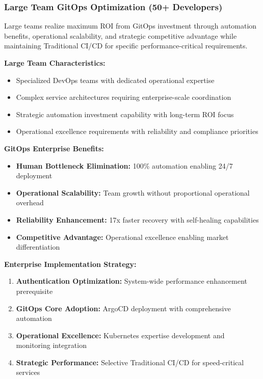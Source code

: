 \subsubsection{Large Team GitOps Optimization (50+ Developers)}

Large teams realize maximum ROI from GitOps investment through automation benefits, operational scalability, and strategic competitive advantage while maintaining Traditional CI/CD for specific performance-critical requirements.

\textbf{Large Team Characteristics:}
\begin{itemize}
\item Specialized DevOps teams with dedicated operational expertise
\item Complex service architectures requiring enterprise-scale coordination
\item Strategic automation investment capability with long-term ROI focus
\item Operational excellence requirements with reliability and compliance priorities
\end{itemize}

\textbf{GitOps Enterprise Benefits:}
\begin{itemize}
\item \textbf{Human Bottleneck Elimination:} 100\% automation enabling 24/7 deployment
\item \textbf{Operational Scalability:} Team growth without proportional operational overhead
\item \textbf{Reliability Enhancement:} 17x faster recovery with self-healing capabilities
\item \textbf{Competitive Advantage:} Operational excellence enabling market differentiation
\end{itemize}

\textbf{Enterprise Implementation Strategy:}
\begin{enumerate}
\item \textbf{Authentication Optimization:} System-wide performance enhancement prerequisite
\item \textbf{GitOps Core Adoption:} ArgoCD deployment with comprehensive automation
\item \textbf{Operational Excellence:} Kubernetes expertise development and monitoring integration
\item \textbf{Strategic Performance:} Selective Traditional CI/CD for speed-critical services
\end{enumerate}

